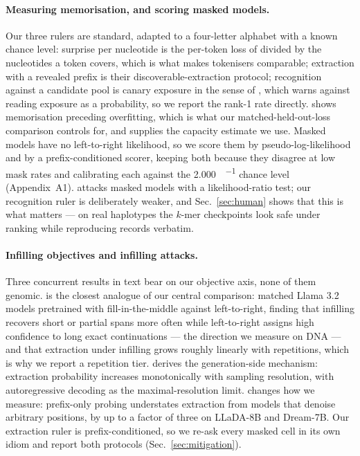 \paragraph{Measuring memorisation, and scoring masked models.}
Our three rulers are standard, adapted to a four-letter alphabet with a known chance level: surprise
per nucleotide is the per-token loss of \cite{carlini2023quantifying} divided by the nucleotides a
token covers, which is what makes tokenisers comparable; extraction with a revealed prefix is their
discoverable-extraction protocol; recognition against a candidate pool is canary exposure in the
sense of \cite{jagielski2023canary}, which warns against reading exposure as a probability, so we
report the rank-1 rate directly. \cite{tirumala2022memorization} shows memorisation preceding
overfitting, which is what our matched-held-out-loss comparison controls for, and
\cite{morris2025capacity} supplies the capacity estimate we use. Masked models have no left-to-right
likelihood, so we score them by pseudo-log-likelihood \cite{salazar2020pll} and by a
prefix-conditioned scorer, keeping both because they disagree at low mask rates and calibrating each
against the \SI{2.000}{\bit\per\nucleotide} chance level (Appendix~A1). \cite{mireshghallah2022mlm}
attacks masked models with a likelihood-ratio test; our recognition ruler is deliberately weaker,
and Sec.~\ref{sec:human} shows that this is what matters --- on real haplotypes the $k$-mer
checkpoints look safe under ranking while reproducing records verbatim.

\paragraph{Infilling objectives and infilling attacks.}
Three concurrent results in text bear on our objective axis, none of them genomic.
\cite{vonarx2026dynamics} is the closest analogue of our central comparison: matched Llama 3.2
models pretrained with fill-in-the-middle against left-to-right, finding that infilling recovers
short or partial spans more often while left-to-right assigns high confidence to long exact
continuations --- the direction we measure on DNA --- and that extraction under infilling grows
roughly linearly with repetitions, which is why we report a repetition tier.
\cite{luo2026diffusion} derives the generation-side mechanism: extraction probability increases
monotonically with sampling resolution, with autoregressive decoding as the maximal-resolution
limit. \cite{wang2026infilling} changes how we measure: prefix-only probing understates extraction
from models that denoise arbitrary positions, by up to a factor of three on LLaDA-8B and Dream-7B.
Our extraction ruler is prefix-conditioned, so we re-ask every masked cell in its own idiom and
report both protocols (Sec.~\ref{sec:mitigation}).
